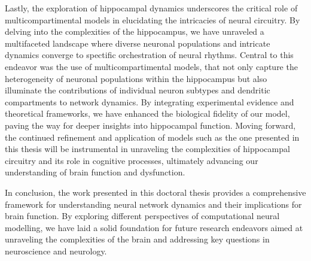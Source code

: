 \documentclass[../main.tex]{subfiles}
\begin{document}
Lastly, the exploration of hippocampal dynamics underscores the critical role of multicompartimental models in elucidating the intricacies of neural circuitry.
By delving into the complexities of the hippocampus, we have unraveled a multifaceted landscape where diverse neuronal populations and intricate dynamics converge to spectific orchestration of neural rhythms.
Central to this endeavor was the use of multicompartimental models, that not only capture the heterogeneity of neuronal populations within the hippocampus but also illuminate the contributions of individual neuron subtypes and dendritic compartments to network dynamics.
By integrating experimental evidence and theoretical frameworks, we have enhanced the biological fidelity of our model, paving the way for deeper insights into hippocampal function.
Moving forward, the continued refinement and application of models such as the one presented in this thesis will be instrumental in unraveling the complexities of hippocampal circuitry and its role in cognitive processes, ultimately advancing our understanding of brain function and dysfunction.

In conclusion, the work presented in this doctoral thesis provides a comprehensive framework for understanding neural network dynamics and their implications for brain function.
By exploring different perspectives of computational neural modelling, we have laid a solid foundation for future research endeavors aimed at unraveling the complexities of the brain and addressing key questions in neuroscience and neurology.
\end{document}
